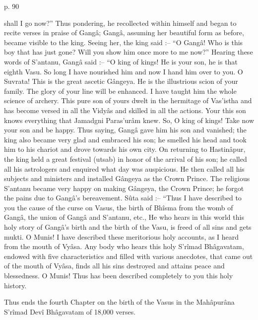  

p. 90

 

shall I go now?” Thus pondering, he recollected within himself and began to recite verses in praise of Gangâ; Gangâ, assuming her beautiful form as before, became visible to the king. Seeing her, the king said :-- “O Gangâ! Who is this boy that has just gone? Will you show him once more to me now?” Hearing these words of S’antanu, Gangâ said :-- “O king of kings! He is your son, he is that eighth Vasu. So long I have nourished him and now I hand him over to you. O Suvrata! This is the great ascetic Gângeya. He is the illustrious scion of your family. The glory of your line will be enhanced. I have taught him the whole science of archery. This pure son of yours dwelt in the hermitage of Vas'istha and has become versed in all the Vidyâs and skilled in all the actions. Your this son knows everything that Jamadgni Paras'urâm knew. So, O king of kings! Take now your son and be happy. Thus saying, Gangâ gave him his son and vanished; the king also became very glad and embraced his son; he smelled his head and took him to his chariot and drove towards his own city. On returning to Hastinâpur, the king held a great festival (utsab) in honor of the arrival of his son; he called all his astrologers and enquired what day was auspicious. He then called all his subjects and ministers and installed Gângeya as the Crown Prince. The religious S’antanu became very happy on making Gângeya, the Crown Prince; he forgot the pains due to Gangâ's bereavement. Sûta said :-- “Thus I have described to you the cause of the curse on Vasus, the birth of Bhîsma from the womb of Gangâ, the union of Gangâ and S’antanu, etc., He who hears in this world this holy story of Gangâ's birth and the birth of the Vasu, is freed of all sins and gets mukti. O Munis! I have described these meritorious holy accounts, as I heard from the mouth of Vyâsa. Any body who hears this holy S’rîmad Bhâgavatam, endowed with five characteristics and filled with various anecdotes, that came out of the mouth of Vyâsa, finds all his sins destroyed and attains peace and blessedness. O Munis! Thus has been described completely to you this holy history.

 

Thus ends the fourth Chapter on the birth of the Vasus in the Mahâpurâna S’rîmad Devî Bhâgavatam of 18,000 verses.

